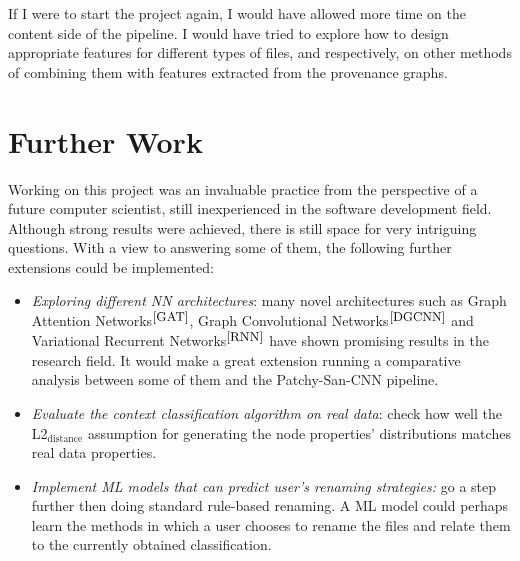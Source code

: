     If I were to start the project again, I would have allowed more time on the content side of the pipeline. I would have tried to explore how to design appropriate features for different types of files, and respectively, on other methods of combining them with features extracted from the provenance graphs. \\ 
    
    \section{Further Work}
    
    Working on this project was an invaluable practice from the perspective of a future computer scientist, still inexperienced in the software development field. Although strong results were achieved, there is still space for very intriguing questions. With a view to answering some of them, the following further extensions could be implemented:
    
    \begin{itemize}
        \item \textit{Exploring different NN architectures}: many novel architectures such as Graph Attention Networks$^{\small \cite{GAT}}$, Graph Convolutional Networks$^{\small \cite{DGCNN}}$ and Variational Recurrent Networks$^{\small \cite{RNN}}$ have shown promising results in the research field. It would make a great extension running a comparative analysis between some of them and the Patchy-San-CNN pipeline.
        
        \item \textit{Evaluate the context classification algorithm on real data}: check how well the L2$_{\text{distance}}$ assumption for generating the node properties' distributions matches real data properties. 
        
        \item \textit{Implement ML models that can predict user's renaming strategies:} go a step further then doing standard rule-based renaming. A ML model could perhaps learn the methods in which a user chooses to rename the files and relate them to the currently obtained classification.    
    
    \end{itemize}
    
